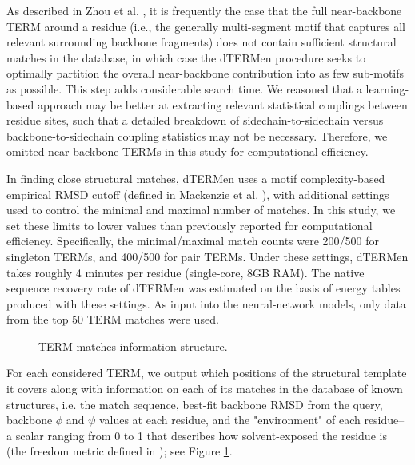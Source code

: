 \documentclass{article}
\begin{document}
As described in Zhou et al. \citep{Zhou2020}, it is frequently the case that the full near-backbone TERM around a residue (i.e., the generally multi-segment motif that captures all relevant surrounding backbone fragments) does not contain sufficient structural matches in the database, in which case the dTERMen procedure seeks to optimally partition the overall near-backbone contribution into as few sub-motifs as possible. This step adds considerable search time. We reasoned that a learning-based approach may be better at extracting relevant statistical couplings between residue sites, such that a detailed breakdown of sidechain-to-sidechain versus backbone-to-sidechain coupling statistics may not be necessary. Therefore, we omitted near-backbone TERMs in this study for computational efficiency.

In finding close structural matches, dTERMen uses a motif complexity-based empirical RMSD cutoff (defined in Mackenzie et al. \citep{Mackenzie2016}), with additional settings used to control the minimal and maximal number of matches. In this study, we set these limits to lower values than previously reported \cite{Zhou2020} for computational efficiency. Specifically, the minimal/maximal match counts were 200/500 for singleton TERMs, and 400/500 for pair TERMs. Under these settings, dTERMen takes roughly 4 minutes per residue (single-core, 8GB RAM). The native sequence recovery rate of dTERMen was estimated on the basis of energy tables produced with these settings. As input into the neural-network models, only data from the top 50 TERM matches were used.

\begin{figure}[ht]
    \centering
    \caption{TERM matches information structure.}
    \label{fig:term_data}
\end{figure}
For each considered TERM, we output which positions of the structural template it covers along with information on each of its matches in the database of known structures, i.e. the match sequence, best-fit backbone RMSD from the query, backbone $\phi$ and $\psi$ values at each residue, and the "environment" of each residue--a scalar ranging from 0 to 1 that describes how solvent-exposed the residue is (the freedom metric defined in \citep{Zheng2017}); see Figure \ref{fig:term_data}.
\end{document}
